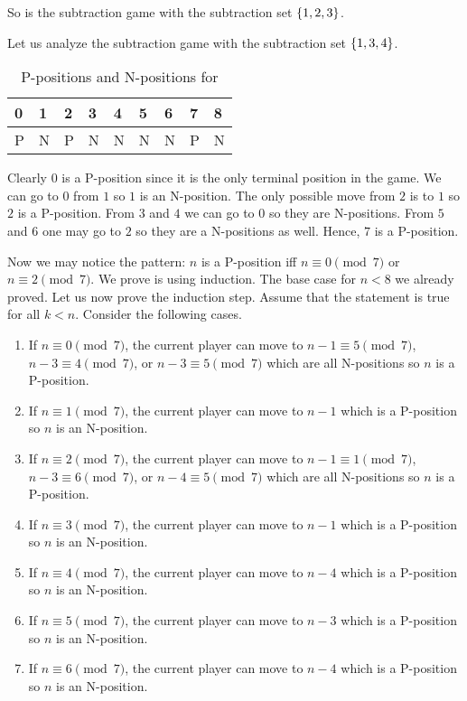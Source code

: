 So  is the subtraction game with the subtraction
set $\set{1, 2, 3}$.

Let us analyze the subtraction game with the subtraction set $\set{1, 3, 4}$.
\begin{table}[h!]
  \centering
  \begin{tabular}{l l l l l l l l l}
      \toprule
      0 & 1 & 2 & 3 & 4 & 5 & 6 & 7 & 8 \\
      \midrule
      P & N & P & N & N & N & N & P & N \\
      \bottomrule
  \end{tabular}
  \caption{P-positions and N-positions for }
  \label{table:subtraction-4-3-1}
\end{table}
Clearly $0$ is a P-position since it is the only terminal position in the game.
We can go to $0$ from $1$ so $1$ is an N-position. The only possible move from
$2$ is to $1$ so $2$ is a P-position. From $3$ and $4$ we can go to $0$
so they are N-positions. From $5$ and $6$ one may go to $2$ so they are a
N-positions as well. Hence, $7$ is a P-position.

Now we may notice the pattern: $n$ is a P-position iff $n \equiv 0 \pmod{7}$
or $n \equiv 2 \pmod{7}$. We prove is using induction. The base case for $n < 8$
we already proved. Let us now prove the induction step. Assume that the
statement is true for all $k < n$. Consider the following cases.
\begin{enumerate}
  \item If $n \equiv 0 \pmod{7}$, the current player can move to
    $n - 1 \equiv 5 \pmod {7}$, $n - 3 \equiv 4 \pmod {7}$, or
    $n - 3 \equiv 5 \pmod {7}$ which are all N-positions so $n$ is a P-position.
  \item If $n \equiv 1 \pmod{7}$, the current player can move to $n - 1$ which
    is a P-position so $n$ is an N-position.
  \item If $n \equiv 2 \pmod{7}$, the current player can move to
    $n - 1 \equiv 1 \pmod {7}$, $n - 3 \equiv 6 \pmod {7}$, or
    $n - 4 \equiv 5 \pmod {7}$ which are all N-positions so $n$ is a P-position.
  \item If $n \equiv 3 \pmod{7}$, the current player can move to $n - 1$ which
    is a P-position so $n$ is an N-position.
  \item If $n \equiv 4 \pmod{7}$, the current player can move to $n - 4$ which
    is a P-position so $n$ is an N-position.
  \item If $n \equiv 5 \pmod{7}$, the current player can move to $n - 3$ which
    is a P-position so $n$ is an N-position.
  \item If $n \equiv 6 \pmod{7}$, the current player can move to $n - 4$ which
    is a P-position so $n$ is an N-position.
\end{enumerate}


